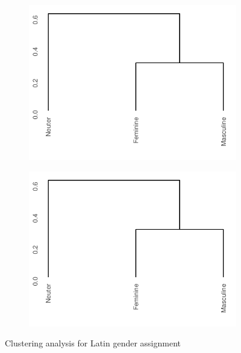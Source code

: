 \begin{figure}

  \begin{subfigure}{.5\textwidth}
    \centering
    \includegraphics[scale=0.6]{./figures/latin/dendro-nouns.pdf}
  \end{subfigure}%
  \begin{subfigure}{.5\textwidth}
    \centering
    \includegraphics[scale=0.6]{./figures/latin/dendro-nouns-small.pdf}
  \end{subfigure}
\caption{Clustering analysis for Latin gender assignment}\label{fig:clustering-latin}
\end{figure}

